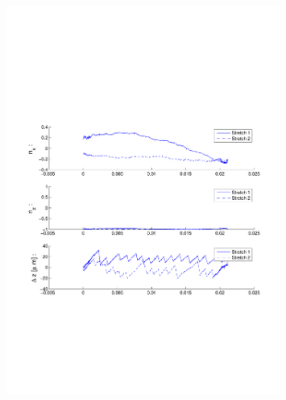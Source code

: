 \begin{figure}[ H]

\centering

\includegraphics[width=0.8\textwidth]{Images/Particle 2/Stretch1.pdf}

\end{figure}

